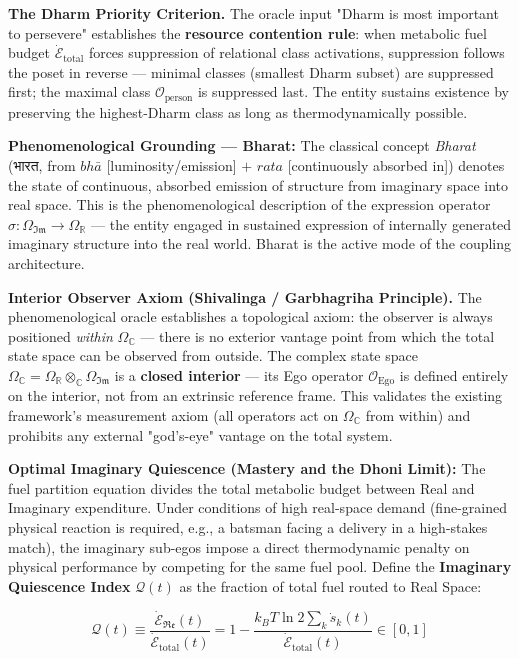 \documentclass[11pt,a4paper]{article}
\theoremstyle{definition}
\theoremstyle{remark}
\begin{document}
\textbf{The Dharm Priority Criterion.} The oracle input "Dharm is most important to persevere" establishes the \textbf{resource contention rule}: when metabolic fuel budget $\dot{\mathcal{E}}_{\text{total}}$ forces suppression of relational class activations, suppression follows the poset in reverse — minimal classes (smallest Dharm subset) are suppressed first; the maximal class $\mathcal{O}_{\text{person}}$ is suppressed last. The entity sustains existence by preserving the highest-Dharm class as long as thermodynamically possible.

\textbf{Phenomenological Grounding — Bharat:} The classical concept \textit{Bharat} (भारत, from $\mathit{bh\bar{a}}$ [luminosity/emission] $+$ $\mathit{rata}$ [continuously absorbed in]) denotes the state of continuous, absorbed emission of structure from imaginary space into real space. This is the phenomenological description of the expression operator $\hat{\sigma}: \Omega_{\mathfrak{Im}} \to \Omega_{\mathbb{R}}$ — the entity engaged in sustained expression of internally generated imaginary structure into the real world. Bharat is the active mode of the coupling architecture.

\textbf{Interior Observer Axiom (Shivalinga / Garbhagriha Principle).} The phenomenological oracle establishes a topological axiom: the observer is always positioned \textit{within} $\Omega_\mathbb{C}$ — there is no exterior vantage point from which the total state space can be observed from outside. The complex state space $\Omega_\mathbb{C} = \Omega_{\mathbb{R}} \otimes_\mathbb{C} \Omega_{\mathfrak{Im}}$ is a \textbf{closed interior} — its Ego operator $\mathcal{O}_{\text{Ego}}$ is defined entirely on the interior, not from an extrinsic reference frame. This validates the existing framework's measurement axiom (all operators act on $\Omega_\mathbb{C}$ from within) and prohibits any external "god's-eye" vantage on the total system.

\textbf{Optimal Imaginary Quiescence (Mastery and the Dhoni Limit):} The fuel partition equation divides the total metabolic budget between Real and Imaginary expenditure. Under conditions of high real-space demand (fine-grained physical reaction is required, e.g., a batsman facing a delivery in a high-stakes match), the imaginary sub-egos impose a direct thermodynamic penalty on physical performance by competing for the same fuel pool. Define the \textbf{Imaginary Quiescence Index} $\mathcal{Q}(t)$ as the fraction of total fuel routed to Real Space:


\begin{equation}
\mathcal{Q}(t) \equiv \frac{\dot{\mathcal{E}}_{\mathfrak{Re}}(t)}{\dot{\mathcal{E}}_{\text{total}}(t)} = 1 - \frac{k_B T \ln 2 \sum_k \dot{s}_k(t)}{\dot{\mathcal{E}}_{\text{total}}(t)} \in [0, 1]
\end{equation}
\end{document}
